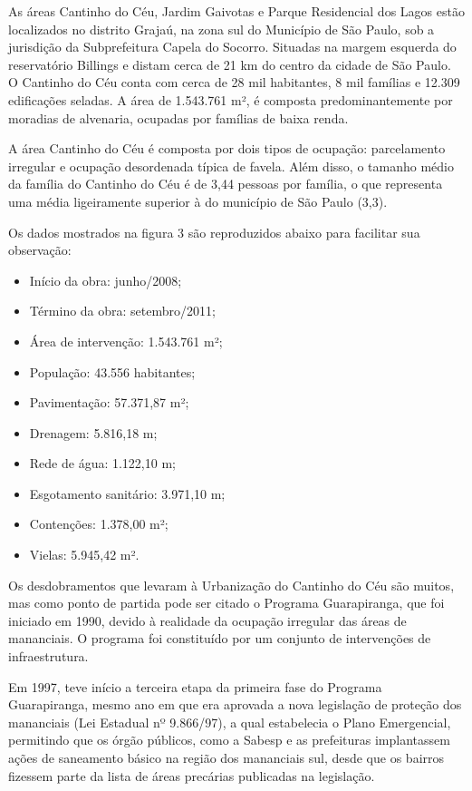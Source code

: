 	As áreas Cantinho do Céu, Jardim Gaivotas e Parque Residencial dos Lagos estão localizados no distrito Grajaú, na zona sul do Município de São Paulo, sob a jurisdição da Subprefeitura Capela do Socorro. Situadas na margem esquerda do reservatório Billings e distam cerca de 21 km do centro da cidade de São Paulo. O Cantinho do Céu conta com cerca de 28 mil habitantes, 8 mil famílias e 12.309 edificações seladas. A área de 1.543.761 m², é composta predominantemente por moradias de alvenaria, ocupadas por famílias de baixa renda. \cite{Barda2012}
	
	
	A área Cantinho do Céu é composta por dois tipos de ocupação: parcelamento irregular e ocupação desordenada típica de favela. Além disso, o tamanho médio da família do Cantinho do Céu é de 3,44 pessoas por família, o que representa uma média ligeiramente superior à do município de São Paulo (3,3). \cite{Barda2012}
	
	Os dados mostrados na figura 3 são reproduzidos abaixo para facilitar sua observação:
	
	\begin{itemize}
	    \item Início da obra: junho/2008;
	    \item Término da obra: setembro/2011;
	    \item Área de intervenção: 1.543.761 m²;
	    \item População: 43.556 habitantes;
	    \item Pavimentação: 57.371,87 m²;
	    \item Drenagem: 5.816,18 m;
	    \item Rede de água: 1.122,10 m;
	    \item Esgotamento sanitário: 3.971,10 m;
	    \item Contenções: 1.378,00 m²;
	    \item Vielas: 5.945,42 m².
	\end{itemize}

	Os desdobramentos que levaram à Urbanização do Cantinho do Céu são muitos, mas como ponto de partida pode ser citado o Programa Guarapiranga, que foi iniciado em 1990, devido à realidade da ocupação irregular das áreas de mananciais. O programa foi constituído por um conjunto de intervenções de infraestrutura.
	
	Em 1997, teve início a terceira etapa da primeira fase do Programa Guarapiranga, mesmo ano em que era aprovada a nova legislação de proteção dos mananciais (Lei Estadual nº 9.866/97), a qual estabelecia o Plano Emergencial, permitindo que os órgão públicos, como a Sabesp e as prefeituras implantassem ações de saneamento básico na região dos mananciais sul, desde que os bairros fizessem parte da lista de áreas precárias publicadas na legislação.
	
